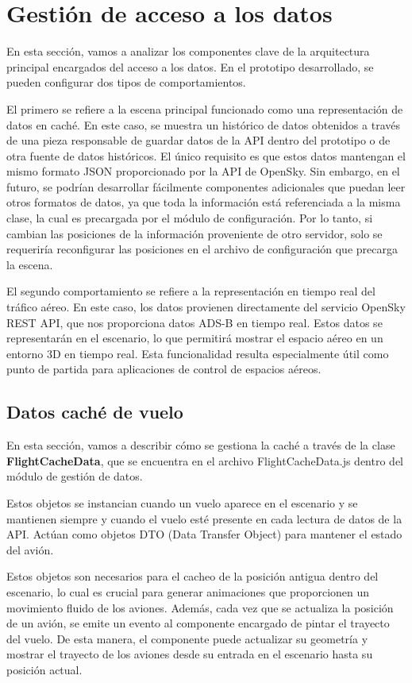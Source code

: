 \documentclass[a4paper, 11pt]{book}
\begin{document}
\section{Gestión de acceso a los datos}
\label{sec:data}
En esta sección, vamos a analizar los componentes clave de la arquitectura principal encargados del acceso a los datos. En el prototipo desarrollado, se pueden configurar dos tipos de comportamientos.

El primero se refiere a la escena principal funcionado como una representación de datos en caché. En este caso, se muestra un histórico de datos obtenidos a través de una pieza responsable de guardar datos de la API dentro del prototipo o de otra fuente de datos históricos. El único requisito es que estos datos mantengan el mismo formato JSON proporcionado por la API de OpenSky. Sin embargo, en el futuro, se podrían desarrollar fácilmente componentes adicionales que puedan leer otros formatos de datos, ya que toda la información está referenciada a la misma clase, la cual es precargada por el módulo de configuración. Por lo tanto, si cambian las posiciones de la información proveniente de otro servidor, solo se requeriría reconfigurar las posiciones en el archivo de configuración que precarga la escena.

El segundo comportamiento se refiere a la representación en tiempo real del tráfico aéreo. En este caso, los datos provienen directamente del servicio OpenSky REST API, que nos proporciona datos ADS-B en tiempo real. Estos datos se representarán en el escenario, lo que permitirá mostrar el espacio aéreo en un entorno 3D en tiempo real. Esta funcionalidad resulta especialmente útil como punto de partida para aplicaciones de control de espacios aéreos.
\subsection{Datos caché de vuelo}
\label{subsec:datosCacheVuelo}
En esta sección, vamos a describir cómo se gestiona la caché a través de la clase \textbf{FlightCacheData}, que se encuentra en el archivo FlightCacheData.js dentro del módulo de gestión de datos.

Estos objetos se instancian cuando un vuelo aparece en el escenario y se mantienen siempre y cuando el vuelo esté presente en cada lectura de datos de la API. Actúan como objetos DTO (Data Transfer Object) para mantener el estado del avión.

Estos objetos son necesarios para el cacheo de la posición antigua dentro del escenario, lo cual es crucial para generar animaciones que proporcionen un movimiento fluido de los aviones. Además, cada vez que se actualiza la posición de un avión, se emite un evento al componente encargado de pintar el trayecto del vuelo. De esta manera, el componente puede actualizar su geometría y mostrar el trayecto de los aviones desde su entrada en el escenario hasta su posición actual.
\end{document}
